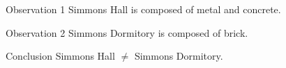 \documentclass[pdf]{beamer}
\begin{document}
\begin{frame}

	\begin{block}{Observation 1}
	Simmons Hall is composed of metal and concrete.
	\end{block}
	\begin{block}{Observation 2}
	Simmons Dormitory is composed of brick.
	\end{block}
	\begin{block}{Conclusion}
	Simmons Hall $\not=$ Simmons Dormitory.
	\end{block}

\end{frame}
\end{document}
